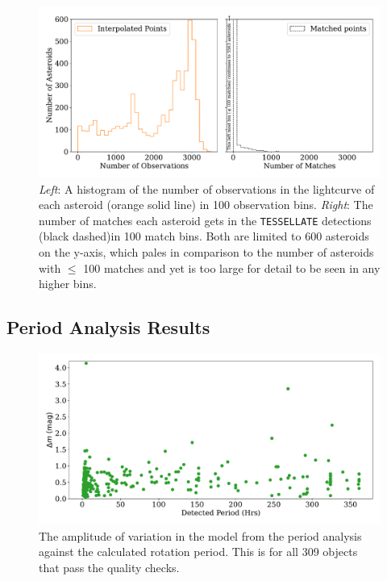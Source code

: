 \documentclass{UCreport}
\begin{document}


\begin{figure} %
  \centering
  \includegraphics[width=\textwidth]{../OzData/pointsMatchesNumberHistdouble1.pdf}
  \caption[Number of observations or matches]{\textit{Left}: A histogram of the number of observations in the lightcurve of each asteroid (orange solid line) in 100 observation bins. \textit{Right}: The number of matches each asteroid gets in the \texttt{TESSELLATE} detections (black dashed)in 100 match bins.
  Both are limited to 600 asteroids on the y-axis, which pales in comparison to the number of asteroids with $\leq$ 100 matches and yet is too large for detail to be seen in any higher bins. }
  \label{Fig:MatchInterpHists}
\end{figure}

\subsection{Period Analysis Results}\label{SubSec:PerRes}


\begin{figure}
  \centering
  \includegraphics[width = \textwidth]{../OzData/QualPervsAmp1.pdf}
  \caption[Amplitude of Variation against Rotaion Period]{The amplitude of variation in the model from the period analysis against the calculated rotation period.
  This is for all 309 %
  objects that pass the quality checks.
  }
  \label{Fig:perVSamp}
\end{figure}
\end{document}

